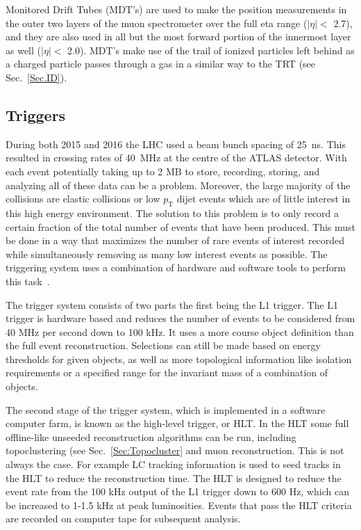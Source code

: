 Monitored Drift Tubes (MDT's) are used to make the position measurements in the outer two layers of the muon spectrometer over the full eta range ($\mid\eta\mid<$ 2.7), and they are also used in all but the most forward portion of the innermost layer as well ($\mid\eta\mid<$ 2.0).  
MDT's make use of the trail of ionized particles left behind as a charged particle passes through a gas in a similar way to the TRT (see Sec.~\ref{Sec.ID}).  
 
 

\subsection{Triggers}
\label{Trig}
During both 2015 and 2016 the LHC used a beam bunch spacing of 25~ns.  
This resulted in crossing rates of 40~MHz at the centre of the ATLAS detector.  
With each event potentially taking up to 2 MB to store, recording, storing, and analyzing all of these data can be a problem.  
Moreover, the large majority of the collisions are elastic collisions or low $p_{\mathrm T}$ dijet events which are of little interest in this high energy environment.  
The solution to this problem is to only record a certain fraction of the total number of events that have been produced.  
This must be done in a way that maximizes the number of rare events of interest recorded while simultaneously removing as many low interest events as possible.  
The triggering system uses a combination of hardware and software tools to perform this task~\cite{Run2Triggers}.  

The trigger system consists of two parts the first being the L1 trigger.  
The L1 trigger is hardware based and reduces the number of events to be considered from 40 MHz per second down to 100 kHz.  
It uses a more course object definition than the full event reconstruction.  
Selections can still be made based on energy thresholds for given objects, as well as more topological information like isolation requirements or a specified range for the invariant mass of a combination of objects.  

The second stage of the trigger system, which is implemented in a software computer farm, is known as the high-level trigger, or HLT.  
In the HLT some full offline-like unseeded reconstruction algorithms can be run, including topoclustering (see Sec.~\ref{Sec:Topocluster} and muon reconstruction.  
This is not always the case.  
For example LC tracking information is used to seed tracks in the HLT to reduce the reconstruction time.  
The HLT is designed to reduce the event rate from the 100 kHz output of the L1 trigger down to 600 Hz, which can be increased to 1-1.5 kHz at peak luminosities.  
Events that pass the HLT criteria are recorded on computer tape for subsequent analysis.   


